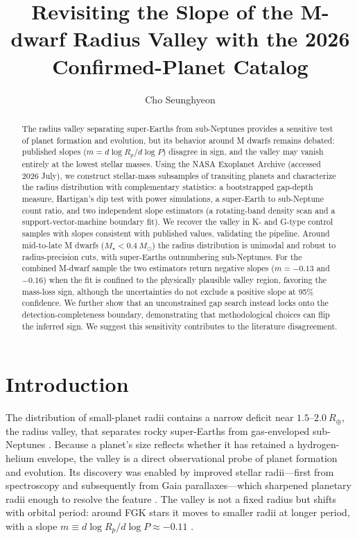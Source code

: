 \documentclass[twocolumn]{aastex701}
\newcommand{\rade}{R_\oplus}
\newcommand{\msun}{M_\odot}
\newcommand{\slope}{m}
\begin{document}
\title{Revisiting the Slope of the M-dwarf Radius Valley with the 2026 Confirmed-Planet Catalog}

\author{Cho Seunghyeon}

\begin{abstract}
The radius valley separating super-Earths from sub-Neptunes provides a
sensitive test of planet formation and evolution, but its behavior around
M dwarfs remains debated: published slopes ($\slope = d\log R_p/d\log P$)
disagree in sign, and the valley may vanish entirely at the lowest stellar
masses. Using the NASA Exoplanet Archive (accessed 2026 July), we construct
stellar-mass subsamples of transiting planets and characterize the radius
distribution with complementary statistics: a bootstrapped gap-depth measure,
Hartigan's dip test with power simulations, a super-Earth to sub-Neptune count
ratio, and two independent slope estimators (a rotating-band density scan and
a support-vector-machine boundary fit). We recover the valley in K- and
G-type control samples with slopes consistent with published values,
validating the pipeline. Around mid-to-late M dwarfs
($M_\star < 0.4~\msun$) the radius distribution is unimodal and robust to
radius-precision cuts, with super-Earths outnumbering sub-Neptunes. For the
combined M-dwarf sample the two estimators return negative slopes
($\slope = -0.13$ and $-0.16$) when the fit is confined to the physically
plausible valley region, favoring the mass-loss sign, although the
uncertainties do not exclude a positive slope at 95\% confidence. We further
show that an unconstrained gap search instead locks onto the
detection-completeness boundary, demonstrating that methodological choices can
flip the inferred sign. We suggest this sensitivity contributes to the
literature disagreement.
\end{abstract}


\section{Introduction} \label{sec:intro}

The distribution of small-planet radii contains a narrow deficit near
$1.5$--$2.0~\rade$, the radius valley, that separates rocky super-Earths from
gas-enveloped sub-Neptunes \citep{Fulton2017}. Because a planet's size reflects
whether it has retained a hydrogen-helium envelope, the valley is a direct
observational probe of planet formation and evolution. Its discovery was
enabled by improved stellar radii---first from spectroscopy and subsequently
from Gaia parallaxes---which sharpened planetary radii enough to resolve the
feature \citep{Fulton2018}. The valley is not a fixed radius but shifts with
orbital period: around FGK stars it moves to smaller radii at longer period,
with a slope $\slope \equiv d\log R_p/d\log P \approx -0.11$
\citep{VanEylen2018}.
\end{document}
